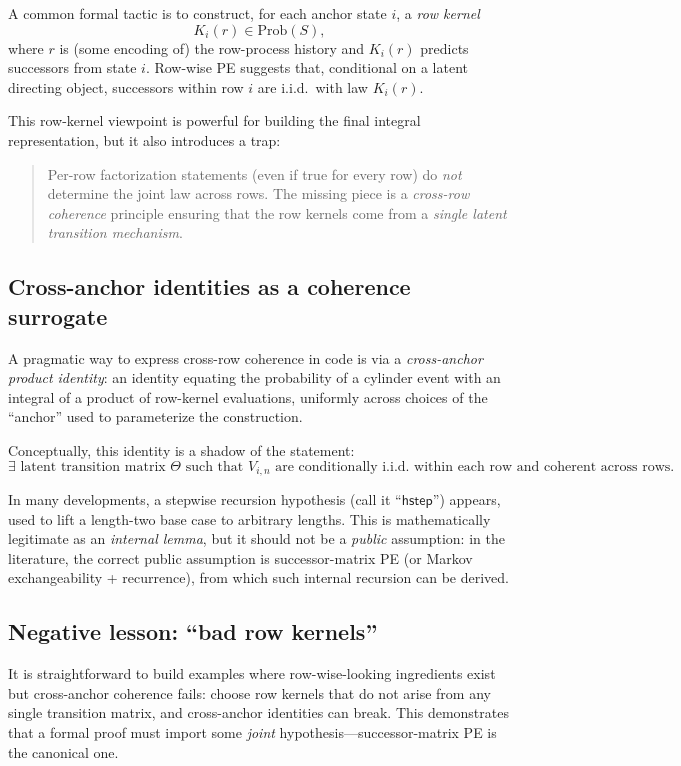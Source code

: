 \documentclass[11pt]{article}
\begin{document}
A common formal tactic is to construct, for each anchor state \(i\), a \emph{row kernel}
\[
K_i(r) \in \mathrm{Prob}(S),
\]
where \(r\) is (some encoding of) the row-process history and \(K_i(r)\) predicts successors from state \(i\).
Row-wise PE suggests that, conditional on a latent directing object, successors within row \(i\) are i.i.d.\ with law \(K_i(r)\).

This row-kernel viewpoint is powerful for building the final integral representation, but it also introduces a trap:

\begin{quote}
Per-row factorization statements (even if true for every row) do \emph{not} determine the joint law across rows.
The missing piece is a \emph{cross-row coherence} principle ensuring that the row kernels come from a \emph{single latent transition mechanism}.
\end{quote}

\subsection{Cross-anchor identities as a coherence surrogate}

A pragmatic way to express cross-row coherence in code is via a \emph{cross-anchor product identity}:
an identity equating the probability of a cylinder event with an integral of a product of row-kernel evaluations,
uniformly across choices of the ``anchor'' used to parameterize the construction.

Conceptually, this identity is a shadow of the statement:
\[
\exists \text{ latent transition matrix } \Theta \text{ such that } V_{i,n} \text{ are conditionally i.i.d.\ within each row and coherent across rows.}
\]

In many developments, a stepwise recursion hypothesis (call it ``\(\mathsf{hstep}\)'') appears, used to lift a length-two base case to arbitrary lengths.
This is mathematically legitimate as an \emph{internal lemma}, but it should not be a \emph{public} assumption:
in the literature, the correct public assumption is successor-matrix PE (or Markov exchangeability + recurrence), from which such internal recursion can be derived.

\subsection{Negative lesson: ``bad row kernels''}

It is straightforward to build examples where row-wise-looking ingredients exist but cross-anchor coherence fails:
choose row kernels that do not arise from any single transition matrix, and cross-anchor identities can break.
This demonstrates that a formal proof must import some \emph{joint} hypothesis---successor-matrix PE is the canonical one.
\end{document}

